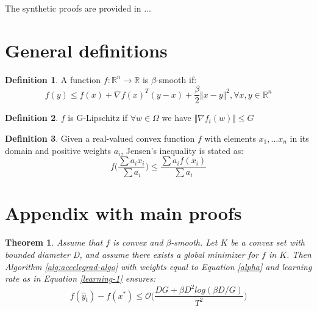 \documentclass[12pt]{article}
\newtheorem{theorem}{Theorem}
\theoremstyle{definition}
\newtheorem{definition}{Definition}[section]
\begin{document}
The synthetic proofs are provided in ...


%
%

\section{General definitions}


\begin{definition}
	A function $f: \mathbb{R}^n \rightarrow \mathbb{R}$ is $\beta$-smooth if:
	$$
		f(y) \leq f(x) + \nabla f(x)^T(y-x) + \frac{\beta}{2} \Vert x-y \Vert^2, \forall x,y \in \mathbb{R}^n
	$$
\label{b-smooth}
\end{definition}

\begin{definition}
	$f$ is G-Lipschitz if $\forall w \in \Omega$ we have $\Vert \nabla f_i(w) \Vert \leq G$
\label{g-lipschitz}
\end{definition}

\begin{definition}
	Given a real-valued convex function $f$ with elements $x_1, \dots x_n$ in its domain and positive weights $a_i$, Jensen's inequality is stated as:
	$$
		f\bigg(\frac{\sum a_i x_i }{\sum a_i}\bigg) \leq \frac{\sum a_i f(x_i)}{\sum a_i}
	$$
\label{jensen}
\end{definition}





\section{Appendix with main proofs}

\begin{theorem}
Assume that $f$ is convex and $\beta$-smooth. Let $K$ be a convex set with bounded diameter D, and assume there exists a global minimizer for $f$ in $K$. Then Algorithm \ref{alg:accelegrad-algo} with weights equal to Equation \ref{alpha} and learning rate as in Equation \ref{learning-1} ensures:
$$
f(\hat y_t) - f(x^*) \leq \mathcal{O} \bigg (\frac{DG + \beta D^2 log(\beta D / G)}{T^2}\bigg)
$$
\label{Theorem-1-acc}
\end{theorem}
\end{document}
